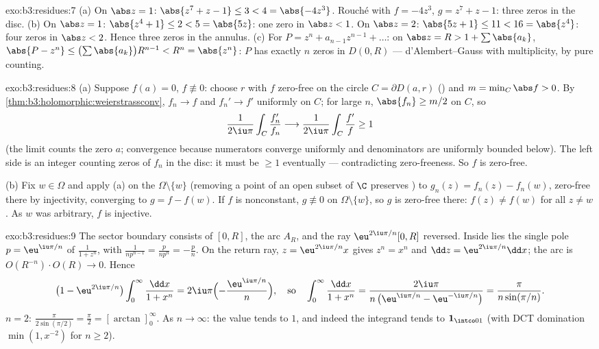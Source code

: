 \begin{solution}{exo:b3:residues:7}
(a) On $\abs z = 1$: $\abs{z^7 + z - 1} \leq 3 < 4 =
\abs{-4z^3}$. Rouch\'e with $f = -4z^3$, $g = z^7 + z - 1$:
three zeros in the disc.
(b) On $\abs z = 1$: $\abs{z^4 + 1} \leq 2 < 5 = \abs{5z}$:
one zero in $\abs z < 1$. On $\abs z = 2$: $\abs{5z + 1} \leq
11 < 16 = \abs{z^4}$: four zeros in $\abs z < 2$. Hence three
zeros in the annulus.
(c) For $P = z^n + a_{n-1}z^{n-1} + \dots$: on $\abs z = R >
1 + \sum\abs{a_k}$, $\abs{P - z^n} \leq
\bigl(\sum\abs{a_k}\bigr)R^{n-1} < R^n = \abs{z^n}$: $P$ has
exactly $n$ zeros in $D(0, R)$ --- d'Alembert--Gauss with
multiplicity, by pure counting.
\end{solution}

\begin{solution}{exo:b3:residues:8}
(a) Suppose $f(a) = 0$, $f \not\equiv 0$: choose $r$ with $f$
zero-free on the circle $C = \partial D(a, r)$ () and $m = \min_C\abs f > 0$. By
\cref{thm:b3:holomorphic:weierstrassconv}, $f_n \to f$ and
$f_n' \to f'$ uniformly on $C$; for large $n$, $\abs{f_n}
\geq m/2$ on $C$, so
\[
\frac1{2\iu\pi}\int_C\frac{f_n'}{f_n}
\longrightarrow \frac1{2\iu\pi}\int_C\frac{f'}{f} \geq 1
\]
(the limit counts the zero $a$; convergence because
numerators converge uniformly and denominators are uniformly
bounded below). The left side is an integer counting zeros of
$f_n$ in the disc: it must be $\geq 1$ eventually ---
contradicting zero-freeness. So $f$ is zero-free.

(b) Fix $w \in \Omega$ and apply (a) on the  
$\Omega\setminus\{w\}$ (removing a point of an open 
subset of $\C$ preserves ) to $g_n(z) = f_n(z) -
f_n(w)$, zero-free there by injectivity, converging to $g = f
- f(w)$. If $f$ is nonconstant, $g \not\equiv 0$ on
$\Omega\setminus\{w\}$, so $g$ is zero-free there: $f(z) \neq
f(w)$ for all $z \neq w$. As $w$ was arbitrary, $f$ is
injective.
\end{solution}

\begin{solution}{exo:b3:residues:9}
The sector boundary consists of $[0, R]$, the arc $A_R$, and
the ray $\eu^{2\iu\pi/n}[0, R]$ reversed. Inside lies the
single pole $p = \eu^{\iu\pi/n}$ of $\frac1{1+z^n}$, with
 $\frac1{np^{n-1}} = \frac{p}{np^n} = -\frac pn$. On
the return ray, $z = \eu^{2\iu\pi/n}x$ gives $z^n = x^n$ and
$\dd z = \eu^{2\iu\pi/n}\dd x$; the arc is
$O(R^{-n})\cdot O(R) \to 0$. Hence
\[
\bigl(1 - \eu^{2\iu\pi/n}\bigr)
\int_0^\infty\frac{\dd x}{1 + x^n}
= 2\iu\pi\Bigl(-\frac{\eu^{\iu\pi/n}}n\Bigr),
\quad\text{so}\quad
\int_0^\infty\frac{\dd x}{1+x^n}
= \frac{2\iu\pi}{n\,\bigl(\eu^{\iu\pi/n} -
\eu^{-\iu\pi/n}\bigr)} = \frac{\pi}{n\sin(\pi/n)} .
\]
$n = 2$: $\frac\pi{2\sin(\pi/2)} = \frac\pi2 =
[\arctan]_0^\infty$. As $n \to \infty$: the value tends to
$1$, and indeed the integrand tends to $\mathbf 1_{\intco01}$
(with DCT domination $\min(1, x^{-2})$ for $n \geq 2$).
\end{solution}

